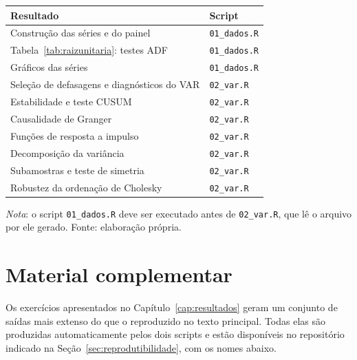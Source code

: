 \documentclass[12pt,openright,oneside,a4paper,portuguese,brazil]{abntex2}
\begin{document}
\begin{apendicesenv}
\begin{quadroabnt}[htbp]
\centering
\caption{Correspondência entre resultados e scripts}
\label{quad:scripts}
\footnotesize
\begin{tabular}{ll}
\toprule
Resultado & Script \\
\midrule
Construção das séries e do painel                          & \texttt{01\_dados.R} \\
Tabela~\ref{tab:raizunitaria}: testes ADF                  & \texttt{01\_dados.R} \\
Gráficos das séries                                        & \texttt{01\_dados.R} \\
Seleção de defasagens e diagnósticos do VAR                & \texttt{02\_var.R} \\
Estabilidade e teste CUSUM                                 & \texttt{02\_var.R} \\
Causalidade de Granger                                     & \texttt{02\_var.R} \\
Funções de resposta a impulso                              & \texttt{02\_var.R} \\
Decomposição da variância                                  & \texttt{02\_var.R} \\
Subamostras e teste de simetria                            & \texttt{02\_var.R} \\
Robustez da ordenação de Cholesky                          & \texttt{02\_var.R} \\
\bottomrule
\end{tabular}

\vspace{2pt}
\begin{flushleft}\footnotesize
\textit{Nota}: o script \texttt{01\_dados.R} deve ser executado antes de
\texttt{02\_var.R}, que lê o arquivo por ele gerado. Fonte: elaboração própria.
\end{flushleft}
\end{quadroabnt}


\section{Material complementar}
\label{sec:complementar}

Os exercícios apresentados no Capítulo~\ref{cap:resultados} geram um conjunto
de saídas mais extenso do que o reproduzido no texto principal. Todas elas são produzidas automaticamente pelos dois scripts e estão
disponíveis no repositório indicado na Seção~\ref{sec:reprodutibilidade}, com
os nomes abaixo.


\end{apendicesenv}
\end{document}
